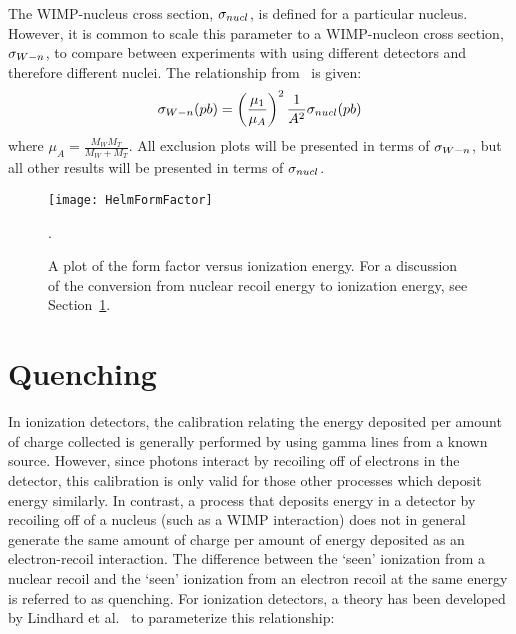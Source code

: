 The WIMP-nucleus cross section, $\sigma_{nucl}$, is defined for a particular nucleus.  However, it is common to scale this parameter to a WIMP-nucleon cross section, $\sigma_{W-n}$, to compare between experiments with using different detectors and therefore different nuclei.  The relationship from~\cite{Alner2005444} is given: 
		\begin{equation}
			\sigma_{W-n} (pb) = \left( \frac{\mu_{1}}{\mu_{A}} \right)^{2}\frac{1}{A^{2}} \sigma_{nucl} (pb)
			\label{eqn:SigmaConversion}
		\end{equation}
where $\mu_{A} = \frac{M_{W} M_{T}}{M_{W} + M_{T}}$.  All exclusion plots will be presented in terms of $\sigma_{W-n}$, but all other results will be presented in terms of $\sigma_{nucl}$.

		\begin{figure}
			\centering
			\texttt{[image: HelmFormFactor]}
			\caption{A plot of the form factor versus ionization energy.  For a discussion of the 
			conversion from nuclear recoil energy to ionization energy, see 
			Section~\ref{sec:ResultsQuenching}.}
			\label{fig:HelmFF}.
		\end{figure}
	\section{Quenching}
	\label{sec:ResultsQuenching}
In ionization detectors, the calibration relating the energy deposited per amount of charge collected is generally performed by using gamma lines from a known source.  However, since photons interact by recoiling off of electrons in the detector, this calibration is only valid for those other processes which deposit energy similarly.  In contrast, a process that deposits energy in a detector by recoiling off of a nucleus (such as a WIMP interaction) does not in general generate the same amount of charge per amount of energy deposited as an electron-recoil interaction.  The difference between the `seen' ionization from a nuclear recoil and the `seen' ionization from an electron recoil at the same energy is referred to as quenching.  For ionization detectors, a theory has been developed by Lindhard et al.~\cite{Lindhard:1961fa} to parameterize this relationship:

